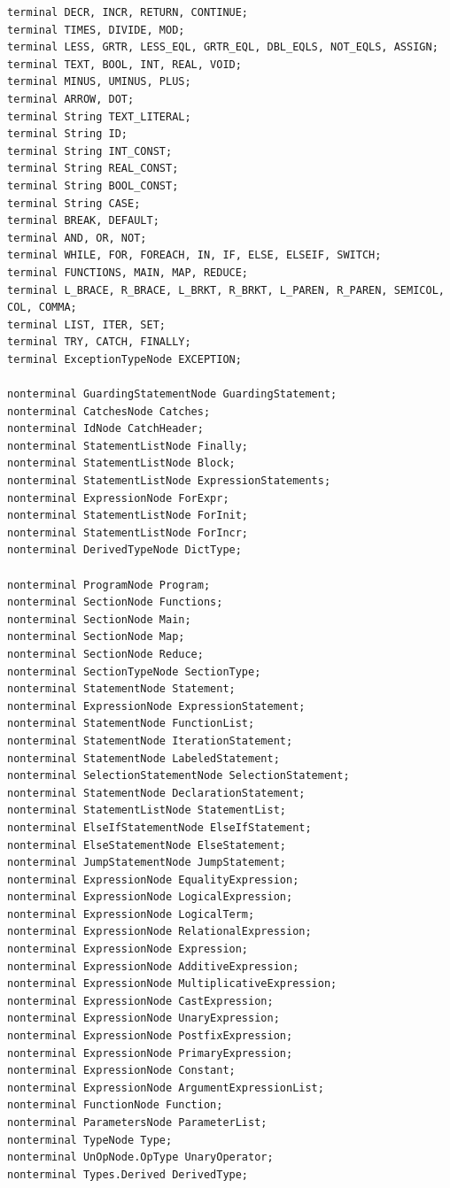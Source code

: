 \documentclass{report}
\begin{document}
\begin{verbatim}
terminal DECR, INCR, RETURN, CONTINUE;
terminal TIMES, DIVIDE, MOD;
terminal LESS, GRTR, LESS_EQL, GRTR_EQL, DBL_EQLS, NOT_EQLS, ASSIGN;
terminal TEXT, BOOL, INT, REAL, VOID;
terminal MINUS, UMINUS, PLUS;
terminal ARROW, DOT;
terminal String TEXT_LITERAL;
terminal String ID;
terminal String INT_CONST;
terminal String REAL_CONST;
terminal String BOOL_CONST;
terminal String CASE;
terminal BREAK, DEFAULT;
terminal AND, OR, NOT;
terminal WHILE, FOR, FOREACH, IN, IF, ELSE, ELSEIF, SWITCH;
terminal FUNCTIONS, MAIN, MAP, REDUCE;
terminal L_BRACE, R_BRACE, L_BRKT, R_BRKT, L_PAREN, R_PAREN, SEMICOL, COL, COMMA;
terminal LIST, ITER, SET;
terminal TRY, CATCH, FINALLY;
terminal ExceptionTypeNode EXCEPTION;

nonterminal GuardingStatementNode GuardingStatement;
nonterminal CatchesNode Catches;
nonterminal IdNode CatchHeader;
nonterminal StatementListNode Finally;
nonterminal StatementListNode Block;
nonterminal StatementListNode ExpressionStatements;
nonterminal ExpressionNode ForExpr;
nonterminal StatementListNode ForInit;
nonterminal StatementListNode ForIncr;
nonterminal DerivedTypeNode DictType;

nonterminal ProgramNode Program;
nonterminal SectionNode Functions;
nonterminal SectionNode Main;
nonterminal SectionNode Map;
nonterminal SectionNode Reduce;
nonterminal SectionTypeNode SectionType;
nonterminal StatementNode Statement;
nonterminal ExpressionNode ExpressionStatement;
nonterminal StatementNode FunctionList;
nonterminal StatementNode IterationStatement;
nonterminal StatementNode LabeledStatement;
nonterminal SelectionStatementNode SelectionStatement;
nonterminal StatementNode DeclarationStatement;
nonterminal StatementListNode StatementList;
nonterminal ElseIfStatementNode ElseIfStatement;
nonterminal ElseStatementNode ElseStatement;
nonterminal JumpStatementNode JumpStatement;
nonterminal ExpressionNode EqualityExpression;
nonterminal ExpressionNode LogicalExpression;
nonterminal ExpressionNode LogicalTerm;
nonterminal ExpressionNode RelationalExpression;
nonterminal ExpressionNode Expression;
nonterminal ExpressionNode AdditiveExpression;
nonterminal ExpressionNode MultiplicativeExpression;
nonterminal ExpressionNode CastExpression;
nonterminal ExpressionNode UnaryExpression;
nonterminal ExpressionNode PostfixExpression;
nonterminal ExpressionNode PrimaryExpression;
nonterminal ExpressionNode Constant;
nonterminal ExpressionNode ArgumentExpressionList;
nonterminal FunctionNode Function;
nonterminal ParametersNode ParameterList;
nonterminal TypeNode Type;
nonterminal UnOpNode.OpType UnaryOperator;
nonterminal Types.Derived DerivedType;


\end{verbatim}
\end{document}
